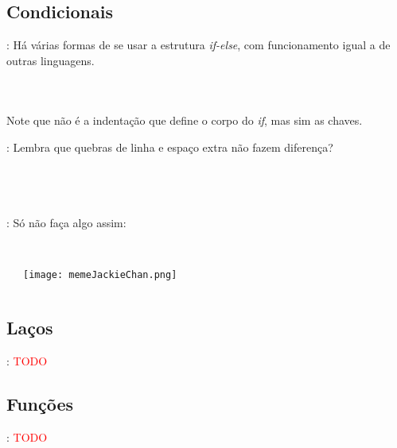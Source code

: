 \subsection{Condicionais}


\begin{frame}{\insertsection: \insertsubsection}
  Há várias formas de se usar a estrutura \textit{if-else}, com funcionamento igual a de outras linguagens.
  \begin{columns}[t]
    \inputminted[firstline=1,lastline=3]{arduino}{sketches/introLinguagem/.condicionais.ino}
    \inputminted[firstline=1,lastline=6]{arduino}{sketches/introLinguagem/.condicionais.ino}
    \inputminted[firstline=8,lastline=16]{arduino}{sketches/introLinguagem/.condicionais.ino}
  \end{columns}
  Note que não é a indentação que define o corpo do \textit{if}, mas sim as chaves.
\end{frame}


\begin{frame}{\insertsection: \insertsubsection}
  Lembra que quebras de linha e espaço extra não fazem diferença?
  \begin{columns}[t]
    \inputminted[firstline=1,lastline=6]{arduino}{sketches/introLinguagem/.condicionais.ino}\vspace{-\bigskipamount}\\
    \inputminted[firstline=18,lastline=22]{arduino}{sketches/introLinguagem/.condicionais.ino}
    \inputminted[firstline=24,lastline=31]{arduino}{sketches/introLinguagem/.condicionais.ino}
    \inputminted[firstline=33,lastline=39]{arduino}{sketches/introLinguagem/.condicionais.ino}
  \end{columns}
\end{frame}


\begin{frame}{\insertsection: \insertsubsection}
  Só não faça algo assim:
  \begin{columns}[t]
    \inputminted[firstline=41,lastline=41]{arduino}{sketches/introLinguagem/.condicionais.ino}\\
    \texttt{[image: memeJackieChan.png]}
    \inputminted[firstline=43,lastline=52]{arduino}{sketches/introLinguagem/.condicionais.ino}
  \end{columns}
\end{frame}


\subsection{Laços}


\begin{frame}{\insertsection: \insertsubsection}
  \textcolor{red}{TODO}
\end{frame}


\subsection{Funções}


\begin{frame}{\insertsection: \insertsubsection}
  \textcolor{red}{TODO}
\end{frame}
